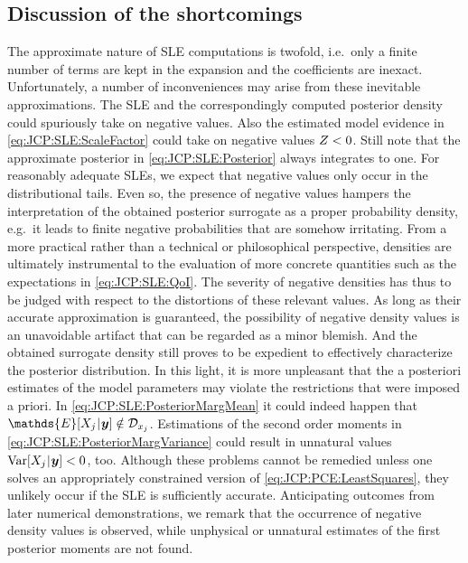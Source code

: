 \subsection{Discussion of the shortcomings}
The approximate nature of SLE computations is twofold, i.e.\ only a finite number of terms are kept in the expansion and the coefficients are inexact.
Unfortunately, a number of inconveniences may arise from these inevitable approximations.
The SLE and the correspondingly computed posterior density could spuriously take on negative values.
Also the estimated model evidence in \cref{eq:JCP:SLE:ScaleFactor} could take on negative values \(Z < 0\).
Still note that the approximate posterior in \cref{eq:JCP:SLE:Posterior} always integrates to one.
For reasonably adequate SLEs, we expect that negative values only occur in the distributional tails.
Even so, the presence of negative values hampers the interpretation of the obtained posterior surrogate as a proper probability density,
e.g.\ it leads to finite negative probabilities that are somehow irritating.
From a more practical rather than a technical or philosophical perspective,
densities are ultimately instrumental to the evaluation of more concrete quantities such as the expectations in \cref{eq:JCP:SLE:QoI}.
The severity of negative densities has thus to be judged with respect to the distortions of these relevant values.
As long as their accurate approximation is guaranteed,
the possibility of negative density values is an unavoidable artifact that can be regarded as a minor blemish.
And the obtained surrogate density still proves to be expedient to effectively characterize the posterior distribution.
In this light, it is more unpleasant that the a posteriori estimates of the model parameters may violate the restrictions that were imposed a priori.
In \cref{eq:JCP:SLE:PosteriorMargMean} it could indeed happen that \(\mathds{E}[X_j \cond \bm{y}] \notin \mathcal{D}_{x_j}\).
Estimations of the second order moments in \cref{eq:JCP:SLE:PosteriorMargVariance} could result in unnatural values \(\mathrm{Var}[X_j {\:\!}|{\:\!} \bm{y}] < 0\), too.
Although these problems cannot be remedied unless one solves an appropriately constrained version of \cref{eq:JCP:PCE:LeastSquares}, they unlikely occur if the SLE is sufficiently accurate.
Anticipating outcomes from later numerical demonstrations, we remark that the occurrence of negative density values is observed,
while unphysical or unnatural estimates of the first posterior moments are not found.
\par %
